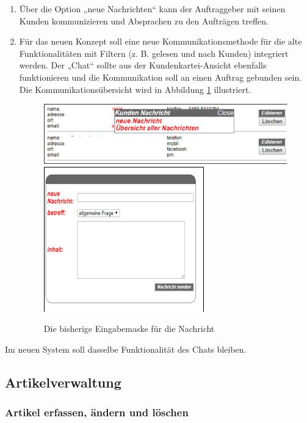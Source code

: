 \begin{enumerate}
	\item Über die Option „neue Nachrichten“ kann der Auftraggeber mit seinen Kunden kommunizieren und Absprachen zu den Aufträgen treffen.
	\item Für das neuen Konzept soll eine neue Kommunikationsmethode für die alte Funktionalitäten mit Filtern (z. B. gelesen und nach Kunden) integriert werden. Der „Chat“ sollte aus der Kundenkartei-Ansicht ebenfalls funktionieren und die Kommunikation soll an einen Auftrag gebunden sein. 
	Die Kommunikationsübersicht wird in Abbildung \ref{fig:NachrichtErscheint} illustriert. 
	\begin{figure}[h]
		\centering
		\includegraphics[width=0.7\linewidth]{Graphics/newNach.png}
		\includegraphics[width=0.7\linewidth]{Graphics/newNachr.png}
		\caption[Neue Nachricht]{Die bisherige Eingabemaske für die Nachricht}
		\label{fig:NachrichtErscheint}
	\end{figure}

\end{enumerate} 
Im neuen System soll dasselbe Funktionalität des Chats bleiben.

\subsection{Artikelverwaltung}

\subsubsection{Artikel erfassen, ändern und löschen}

